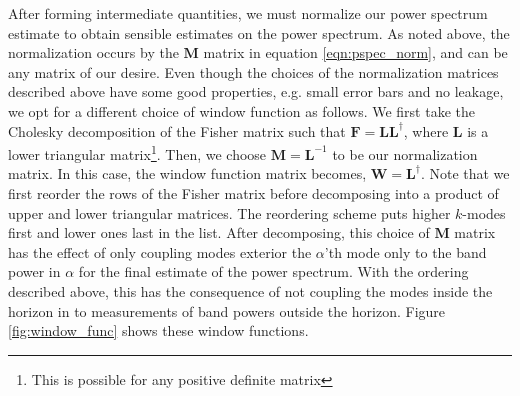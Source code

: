 \documentclass[twocolumn,numberedappendix]{emulateapj} \shorttitle{PSA64}
\begin{document}
After forming intermediate quantities, we must normalize our power spectrum
estimate to obtain sensible estimates on the power spectrum. As noted above, the
normalization occurs by the $\mathbf{M}$ matrix in equation
\ref{eqn:pspec_norm}, and can be any matrix of our desire. 
Even though the choices of the normalization matrices described above have some
good properties, e.g. small error bars and no leakage, we opt for a different
choice of window function as follows. We first take the Cholesky decomposition of
the Fisher matrix such that $\mathbf{F} = \mathbf{L}\mathbf{L}^{\dagger}$, where
$\mathbf{L}$ is a lower triangular matrix\footnote{This is possible for any
positive definite matrix}. Then, we choose ${\mathbf{M}} = \mathbf{L}^{-1}$ to
be our normalization matrix. In this case, the window function matrix becomes,
$\mathbf{W}=\mathbf{L}^{\dagger}$. Note that we first reorder the rows of the
Fisher matrix before decomposing into a product of upper and lower triangular
matrices. The reordering scheme puts higher $k$-modes first and lower ones last
in the list. After decomposing, this choice of $\mathbf{M}$ matrix has the
effect of only coupling modes exterior the $\alpha$'th mode only to the band
power in $\alpha$  for the final estimate of the power spectrum.  With the
ordering described above, this has the consequence of not coupling the modes
inside the horizon in to measurements of band powers outside the horizon. Figure
\ref{fig:window_func} shows these window functions. 
\end{document}
